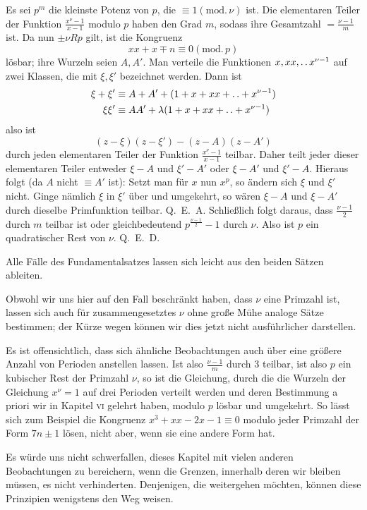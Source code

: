 Es sei $p^m$ die kleinste Potenz von $p$, die $\equiv1(\mathrm{mod.}\,\nu)$ ist. Die elementaren Teiler der Funktion $\frac{x^\nu-1}{x-1}$ modulo $p$ haben den Grad $m$, sodass ihre Gesamtzahl $=\frac{\nu-1}m$ ist. Da nun $\pm\nu Rp$ gilt, ist die Kongruenz
\[
xx+x\mp n\equiv0(\mathrm{mod.}\,p)
\]
lösbar; ihre Wurzeln seien $A,A'$. Man verteile die Funktionen $x,xx,\mathinner{.\,.} x^{\nu-1}$ auf zwei Klassen, die mit $\xi,\xi'$ bezeichnet werden. Dann ist
\[
\begin{aligned}
\xi+\xi'&\equiv A+A'+(1+x+xx+\mathinner{.\,.}+x^{\nu-1})\\
\xi\xi'&\equiv AA'+\lambda(1+x+xx+\mathinner{.\,.}+x^{\nu-1})
\end{aligned}
\]
also ist
\[
(z-\xi)(z-\xi')-(z-A)(z-A')
\]
durch jeden elementaren Teiler der Funktion $\frac{x^\nu-1}{x-1}$ teilbar. Daher teilt jeder dieser elementaren Teiler entweder $\xi-A$ und $\xi'-A'$ oder $\xi-A'$ und $\xi'-A$. Hieraus folgt (da $A$ nicht $\equiv A'$ ist): Setzt man für $x$ nun $x^p$, so ändern sich $\xi$ und $\xi'$ nicht. Ginge nämlich $\xi$ in $\xi'$ über und umgekehrt, so wären $\xi-A$ und $\xi-A'$ durch dieselbe Primfunktion teilbar. Q.\ E.\ A. Schließlich folgt daraus, dass $\frac{\nu-1}2$ durch $m$ teilbar ist oder gleichbedeutend $p^{\frac{\nu-1}2}-1$ durch $\nu$. Also ist $p$ ein quadratischer Rest von $\nu$. Q.\ E.\ D.

Alle Fälle des Fundamentalsatzes lassen sich leicht aus den beiden Sätzen ableiten.

Obwohl wir uns hier auf den Fall beschränkt haben, dass $\nu$ eine Primzahl ist, lassen sich auch für zusammengesetztes $\nu$ ohne große Mühe analoge Sätze bestimmen; der Kürze wegen können wir dies jetzt nicht ausführlicher darstellen.

Es ist offensichtlich, dass sich ähnliche Beobachtungen auch über eine größere Anzahl von Perioden anstellen lassen. Ist also $\frac{\nu-1}m$ durch $3$ teilbar, ist also $p$ ein kubischer Rest der Primzahl $\nu$, so ist die Gleichung, durch die die Wurzeln der Gleichung $x^\nu=1$ auf drei Perioden verteilt werden und deren Bestimmung a priori wir in Kapitel \textsc{vi} gelehrt haben, modulo $p$ lösbar und umgekehrt. So lässt sich zum Beispiel die Kongruenz $x^3+xx-2x-1\equiv0$ modulo jeder Primzahl der Form $7n\pm1$ lösen, nicht aber, wenn sie eine andere Form hat.

Es würde uns nicht schwerfallen, dieses Kapitel mit vielen anderen Beobachtungen zu bereichern, wenn die Grenzen, innerhalb deren wir bleiben müssen, es nicht verhinderten. Denjenigen, die weitergehen möchten, können diese Prinzipien wenigstens den Weg weisen.
